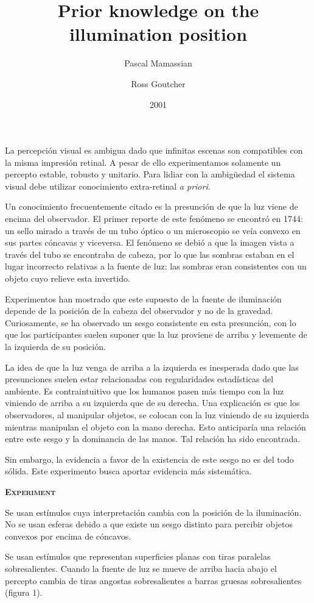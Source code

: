 \documentclass[a4paper,12pt]{article}
\title{Prior knowledge on the illumination position}
\author{Pascal Mamassian \and Ross Goutcher}
\date{2001}
\begin{document}
{\scshape\bfseries \maketitle}

La percepción visual es ambigua dado que infinitas escenas son compatibles con la misma impresión retinal. A pesar de ello experimentamos solamente un percepto estable, robusto y unitario. Para lidiar con la ambigüedad el sistema visual debe utilizar conocimiento extra-retinal {\itshape a priori}.

Un conocimiento frecuentemente citado es la presunción de que la luz viene de encima del observador. El primer reporte de este fenómeno se encontró en 1744: un sello mirado a través de un tubo óptico o un microscopio se veía convexo en sus partes cóncavas y viceversa. El fenómeno se debió a que la imagen vista a través del tubo se encontraba de cabeza, por lo que las sombras estaban en el lugar incorrecto relativas a la fuente de luz: las sombras eran consistentes con un objeto cuyo relieve esta invertido.

Experimentos han mostrado que este supuesto de la fuente de iluminación depende de la posición de la cabeza del observador y no de la gravedad. Curiosamente, se ha observado un sesgo consistente en esta presunción, con lo que los participantes suelen suponer que la luz proviene de arriba y levemente de la izquierda de su posición.

La idea de que la luz venga de arriba a la izquierda es inesperada dado que  las presunciones suelen estar relacionadas con regularidades estadísticas del ambiente. Es contraintuitivo que los humanos pasen más tiempo con la luz viniendo de arriba a su izquierda que de su derecha. Una explicación es que los observadores, al manipular objetos, se colocan con la luz viniendo de su izquierda mientras manipulan el objeto con la mano derecha. Esto anticiparía una relación entre este sesgo y la dominancia de las manos. Tal relación ha sido encontrada.

Sin embargo, la evidencia a favor de la existencia de este sesgo no es del todo sólida. Este experimento busca aportar evidencia más sistemática.

{\scshape\bfseries Experiment}

Se usan estímulos cuya interpretación cambia con la posición de la iluminación. No se usan esferas debido a que existe un sesgo distinto para percibir objetos convexos por encima de cóncavos.

Se usan estímulos que representan superficies planas con tiras paralelas sobresalientes. Cuando la fuente de luz se mueve de arriba hacia abajo el percepto cambia de tiras angostas sobresalientes a barras gruesas sobresalientes (figura 1).
\end{document}

